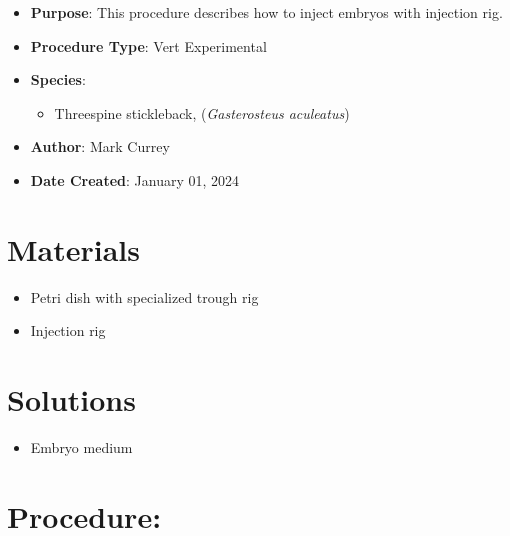 \documentclass[
  letterpaper,
  DIV=11,
  numbers=noendperiod]{scrreprt}
\providecommand{\tightlist}{%
  \setlength{\itemsep}{0pt}\setlength{\parskip}{0pt}}\usepackage{longtable,booktabs,array}
\begin{document}
\begin{itemize}
\tightlist
\item
  \textbf{Purpose}: This procedure describes how to inject embryos with
  injection rig.
\item
  \textbf{Procedure Type}: Vert Experimental
\item
  \textbf{Species}:

  \begin{itemize}
  \tightlist
  \item
    Threespine stickleback, (\emph{Gasterosteus aculeatus})
  \end{itemize}
\item
  \textbf{Author}: Mark Currey\\
\item
  \textbf{Date Created}: January 01, 2024
\end{itemize}

\hypertarget{materials-71}{%
\section{Materials}\label{materials-71}}

\begin{itemize}
\tightlist
\item
  Petri dish with specialized trough rig
\item
  Injection rig
\end{itemize}

\hypertarget{solutions-63}{%
\section{Solutions}\label{solutions-63}}

\begin{itemize}
\tightlist
\item
  Embryo medium
\end{itemize}

\hypertarget{procedure-70}{%
\section{Procedure:}\label{procedure-70}}
\end{document}
